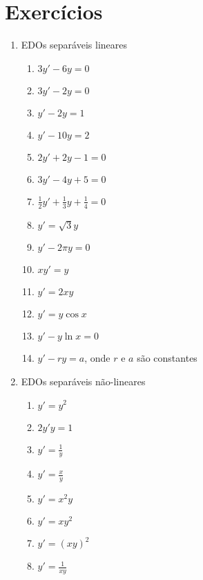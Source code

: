 \documentclass[a4paper]{article}
\begin{document}
\section{Exercícios}

\begin{enumerate}

\item EDOs separáveis lineares
  \begin{enumerate}
  \item $3y' -6y = 0 $
  \item $3y' -2y =0$
  \item $y' - 2y = 1$
  \item $y' - 10y = 2$
  \item $2y' + 2y -1 = 0$
  \item $3y'- 4y +5 = 0$
  \item $\frac{1}{2} y' + \frac{1}{3} y + \frac{1}{4} = 0$
  \item $y' = \sqrt{3}y$
  \item $y' -2\pi y =0$
  \item $xy' = y$
  \item $y' = 2xy$
  \item $y' = y\cos x$
  \item $y' - y\ln x = 0$
  \item $y' -ry = a$, onde $r$ e $a$ são constantes

  \end{enumerate}

\item EDOs separáveis não-lineares
  \begin{enumerate}
  \item $y' = y^2$
  \item $2y'y = 1$
  \item $y' = \frac{1}{y}$
  \item $y' = \frac{x}{y}$
  \item $y' = x^2y$
  \item $y' = xy^2$
  \item $y' = (xy)^2$
  \item $y' = \frac{1}{xy}$
  \end{enumerate}

\end{enumerate}
\end{document}
